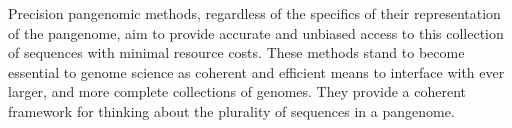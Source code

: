 

Precision pangenomic methods, regardless of the specifics of their representation of the pangenome, aim to provide accurate and unbiased access to this collection of sequences with minimal resource costs.
These methods stand to become essential to genome science as coherent and efficient means to interface with ever larger, and more complete collections of genomes.
They provide a coherent framework for thinking about the plurality of sequences in a pangenome.









